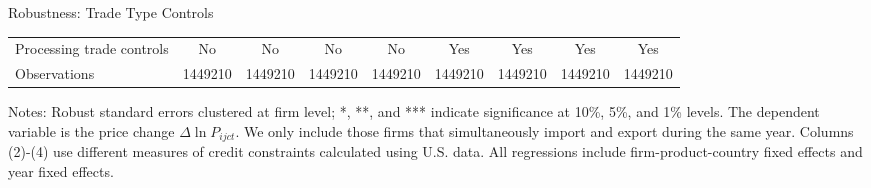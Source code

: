 \documentclass[10pt]{beamer}
\begin{document}
\begin{frame}{Robustness: Trade Type Controls}
\begin{table}[htbp]
{\begin{threeparttable}
\begin{tabular}{lcccccccc}
			Processing trade controls & No & No & No & No &  Yes   & Yes   & Yes  & Yes \\
			Observations & 1449210 & 1449210 & 1449210 & 1449210 & 1449210 & 1449210 & 1449210 & 1449210\\
			\bottomrule
		\end{tabular}
		\begin{tablenotes}
			\footnotesize
			\item Notes: Robust standard errors clustered at firm level; *, **, and *** indicate significance at 10\%, 5\%, and 1\% levels. The dependent variable is the price change $\Delta \ln P_{ijct}$. We only include those firms that simultaneously import and export during the same year. Columns (2)-(4) use different measures of credit constraints calculated using U.S. data. All regressions include firm-product-country fixed effects and year fixed effects.
		\end{tablenotes}
	\end{threeparttable}
        }
	\label{tab.robust.tradetype}
    \end{table}
    \hyperlink{robustness_other}{}
\end{frame}
\end{document}
